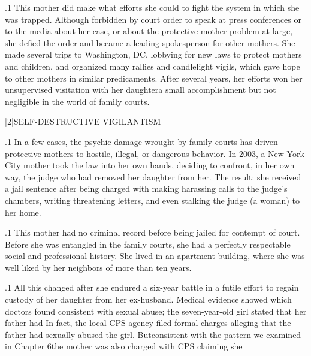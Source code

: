 \documentclass[11pt, twoside]{article}
\begin{document}
{\p.1{%
This mother did make what efforts she could to fight the system in
which she was trapped. Although forbidden by court order to speak at
press conferences or to the media about her case, or about the protective mother problem at large, she defied the  order and became
a leading spokesperson for other mothers. She made several trips to
Washington, DC, lobbying for new laws to protect mothers and children, and organized many rallies and candlelight vigils, which gave
hope to other mothers in similar predicaments. After several years,
her efforts won her unsupervised visitation with her daughter\mdash{}a small
accomplishment but not negligible in the world of family courts.
}%


\s|2|{SELF-DESTRUCTIVE VIGILANTISM}

\p.1{%
\noindent{}In a few cases, the psychic damage wrought by family courts has driven
protective mothers to hostile, illegal, or dangerous behavior.
In 2003, a New York City mother took the law into her own hands,
deciding to confront, in her own way, the judge who had removed
her daughter from her. The result: she received a jail sentence after
being charged with making harassing calls to the judge’s chambers, writing threatening letters, and even stalking the judge (a woman) to her
home.
}%

\p.1{%
This mother had no criminal record before being jailed for contempt of court. Before she was entangled in the family courts, she had
a perfectly respectable social and professional history. She lived in an
apartment building, where she was well liked by her neighbors of more
than ten years.
}%

\p.1{%
All this changed after she endured a six-year battle in a futile effort to regain custody of her daughter from her ex-husband. Medical
evidence showed  which doctors found consistent with sexual abuse;
the seven-year-old girl stated that her father had  In fact, the
local CPS agency filed formal charges alleging that the father had sexually abused the girl. But\mdash{}consistent with the pattern we examined in
Chapter 6\mdash{}the mother was also charged with  CPS claiming
she 
}%

}
\end{document}
